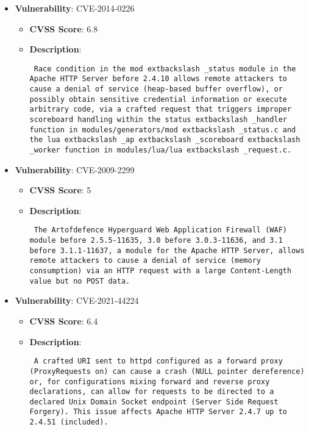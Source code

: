 \documentclass{article}
\begin{document}
\begin{itemize}
        \item \textbf{Vulnerability}: CVE-2014-0226
        \begin{itemize}
            \item \textbf{CVSS Score}:  6.8 
            \item \textbf{Description}: \parbox{\linewidth}{\texttt{ Race condition in the mod	extbackslash _status module in the Apache HTTP Server before 2.4.10 allows remote attackers to cause a denial of service (heap-based buffer overflow), or possibly obtain sensitive credential information or execute arbitrary code, via a crafted request that triggers improper scoreboard handling within the status	extbackslash _handler function in modules/generators/mod	extbackslash _status.c and the lua	extbackslash _ap	extbackslash _scoreboard	extbackslash _worker function in modules/lua/lua	extbackslash _request.c. }}
        \end{itemize}
    
        \item \textbf{Vulnerability}: CVE-2009-2299
        \begin{itemize}
            \item \textbf{CVSS Score}:  5 
            \item \textbf{Description}: \parbox{\linewidth}{\texttt{ The Artofdefence Hyperguard Web Application Firewall (WAF) module before 2.5.5-11635, 3.0 before 3.0.3-11636, and 3.1 before 3.1.1-11637, a module for the Apache HTTP Server, allows remote attackers to cause a denial of service (memory consumption) via an HTTP request with a large Content-Length value but no POST data. }}
        \end{itemize}
    
        \item \textbf{Vulnerability}: CVE-2021-44224
        \begin{itemize}
            \item \textbf{CVSS Score}:  6.4 
            \item \textbf{Description}: \parbox{\linewidth}{\texttt{ A crafted URI sent to httpd configured as a forward proxy (ProxyRequests on) can cause a crash (NULL pointer dereference) or, for configurations mixing forward and reverse proxy declarations, can allow for requests to be directed to a declared Unix Domain Socket endpoint (Server Side Request Forgery). This issue affects Apache HTTP Server 2.4.7 up to 2.4.51 (included). }}
        \end{itemize}
    

\end{itemize}
\end{document}
